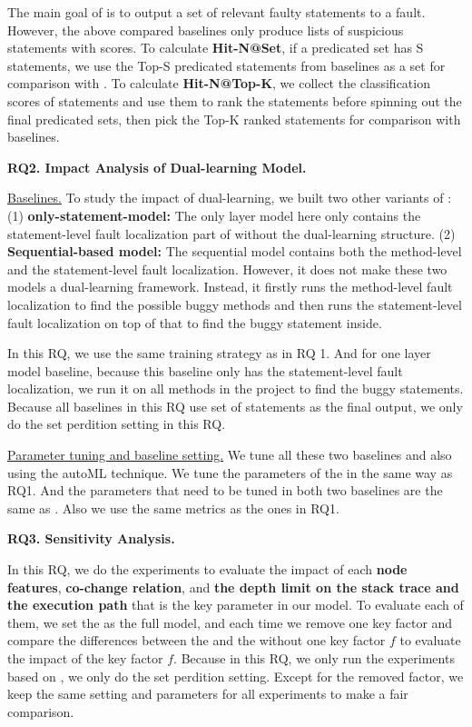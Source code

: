 The main goal of {\tool} is to output a set of relevant faulty statements to a fault. However, the above compared baselines only produce lists of suspicious statements with scores. 
To calculate \textbf{Hit-N@Set}, if a predicated set has S statements, we use the Top-S predicated statements from baselines as a set for comparison with {\tool}. To calculate {\bf Hit-N@Top-K}, we collect the classification scores of statements and use them to rank the statements before spinning out the final predicated sets, then pick the Top-K ranked statements for comparison with baselines.




{\bf RQ2. Impact Analysis of Dual-learning Model.}

\underline{Baselines.} To study the impact of dual-learning, we built two other variants of {\tool}: (1) \textbf{only-statement-model:} The only layer model here only contains the statement-level fault localization part of \tool without the dual-learning structure. (2) \textbf{Sequential-based model:} The sequential model contains both the method-level and the statement-level fault localization. However, it does not make these two models a dual-learning framework. Instead, it firstly runs the method-level fault localization to find the possible buggy methods and then runs the statement-level fault localization on top of that to find the buggy statement inside.

In this RQ, we use the same training strategy as in RQ 1. And for one layer model baseline, because this baseline only has the statement-level fault localization, we run it on all methods in the project to find the buggy statements. Because all baselines in this RQ use set of statements as the final output, we only do the set perdition setting in this RQ.

\underline{ Parameter tuning and baseline setting.} We tune all these two baselines and \tool also using the autoML technique. We tune the parameters of the \tool in the same way as RQ1. And the parameters that need to be tuned in both two baselines are the same as \tool. Also we use the same metrics as the ones in RQ1.

{\bf RQ3. Sensitivity Analysis.}

In this RQ, we do the experiments to evaluate the impact of each {\bf node features}, {\bf co-change relation}, and {\bf the depth limit on the stack trace and the execution path} that is the key parameter in our model. To evaluate each of them, we set the \tool as the full model, and each time we remove one key factor and compare the differences between the \tool and the \tool without one key factor $f$ to evaluate the impact of the key factor $f$. Because in this RQ, we only run the experiments based on \tool, we only do the set perdition setting. Except for the removed factor, we keep the same setting and parameters for all experiments to make a fair comparison.

